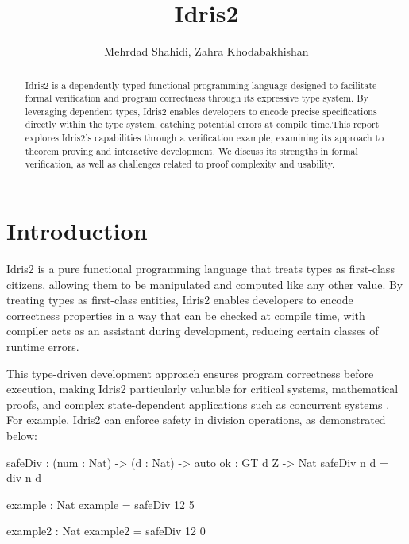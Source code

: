 \documentclass[]{rptuseminar}
\title{Idris2}
\author{Mehrdad Shahidi, Zahra Khodabakhishan
  \institute{Rheinland-Pfälzische Technische Universität Kaiserslautern-Landau, Department of Computer Science}}
\begin{document}

\maketitle


\begin{abstract}
Idris2 is a dependently-typed functional programming language designed to facilitate formal verification and program correctness through its expressive type system. By leveraging dependent types, Idris2 enables developers to encode precise specifications directly within the type system, catching potential errors at compile time.This report explores Idris2’s capabilities through a verification example, examining its approach to theorem proving and interactive development. We discuss its strengths in formal verification, as well as challenges related to proof complexity and usability.
\end{abstract}


\section{Introduction}
\label{sec:introduction}



Idris2 is a pure functional programming language that treats types as first-class citizens, allowing them to be manipulated and computed like any other value. By treating types as first-class entities, Idris2 enables developers to encode correctness properties in a way that can be checked at compile time, with compiler acts as an assistant during development, reducing certain classes of runtime errors.

This type-driven development approach ensures program correctness before execution, making Idris2 particularly valuable for critical systems, mathematical proofs, and complex state-dependent applications such as concurrent systems \cite{brady2021idris}. For example, Idris2 can enforce safety in division operations, as demonstrated below:

\begin{idris}
safeDiv : (num : Nat) -> (d : Nat) -> {auto ok : GT d Z} -> Nat  
safeDiv n d  = div n d  

example : Nat  
example = safeDiv 12 5

example2 : Nat
example2 = safeDiv 12 0
\end{idris}
\end{document}
